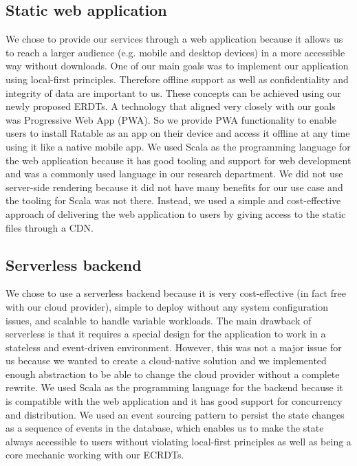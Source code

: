 \documentclass[
	english,
	ruledheaders=section,   %
	class=report,		    %
	thesis={type=bachelor}, %
	accentcolor=9c,			%
	custommargins=true,    %
	marginpar=false,        %
	parskip=half-,          %
	fontsize=11pt,          %
]{tudapub}
\begin{document}
\subsection{Static web application}
We chose to provide our services through a web application because it allows us to reach a larger audience (e.g. mobile and desktop devices) in a more accessible way without downloads. One of our main goals was to implement our application using local-first principles. Therefore offline support as well as confidentiality and integrity of data are important to us. These concepts can be achieved using our newly proposed ERDTs. A technology that aligned very closely with our goals was Progressive Web App (PWA). So we provide PWA functionality to enable users to install Ratable as an app on their device and access it offline at any time using it like a native mobile app. We used Scala as the programming language for the web application because it has good tooling and support for web development and was a commonly used language in our research department. We did not use server-side rendering because it did not have many benefits for our use case and the tooling for Scala was not there. Instead, we used a simple and cost-effective approach of delivering the web application to users by giving access to the static files through a CDN.

\subsection{Serverless backend} 
We chose to use a serverless backend because it is very cost-effective (in fact free with our cloud provider), simple to deploy without any system configuration issues, and scalable to handle variable workloads. The main drawback of serverless is that it requires a special design for the application to work in a stateless and event-driven environment. However, this was not a major issue for us because we wanted to create a cloud-native solution and we implemented enough abstraction to be able to change the cloud provider without a complete rewrite. We used Scala as the programming language for the backend because it is compatible with the web application and it has good support for concurrency and distribution. We used an event sourcing pattern to persist the state changes as a sequence of events in the database, which enables us to make the state always accessible to users without violating local-first principles as well as being a core mechanic working with our ECRDTs.
\end{document}
